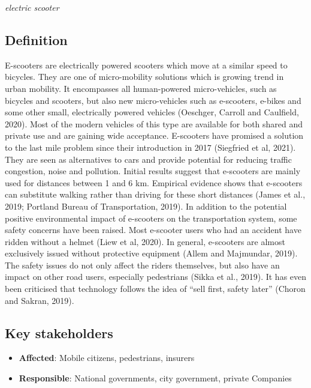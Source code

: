 \documentclass[
]{book}
\providecommand{\tightlist}{%
  \setlength{\itemsep}{0pt}\setlength{\parskip}{0pt}}
\begin{document}
\emph{electric scooter}

\hypertarget{definition-33}{%
\subsection*{Definition}\label{definition-33}}

E-scooters are electrically powered scooters which move at a similar speed to bicycles. They are one of micro-mobility solutions which is growing trend in urban mobility. It encompasses all human-powered micro-vehicles, such as bicycles and scooters, but also new micro-vehicles such as e-scooters, e-bikes and some other small, electrically powered vehicles (Oeschger, Carroll and Caulfield, 2020). Most of the modern vehicles of this type are available for both shared and private use and are gaining wide acceptance.
E-scooters have promised a solution to the last mile problem since their introduction in 2017 (Siegfried et al, 2021). They are seen as alternatives to cars and provide potential for reducing traffic congestion, noise and pollution. Initial results suggest that e-scooters are mainly used for distances between 1 and 6 km. Empirical evidence shows that e-scooters can substitute walking rather than driving for these short distances (James et al., 2019; Portland Bureau of Transportation, 2019). In addition to the potential positive environmental impact of e-scooters on the transportation system, some safety concerns have been raised. Most e-scooter users who had an accident have ridden without a helmet (Liew et al, 2020). In general, e-scooters are almost exclusively issued without protective equipment (Allem and Majmundar, 2019). The safety issues do not only affect the riders themselves, but also have an impact on other road users, especially pedestrians (Sikka et al., 2019). It has even been criticised that technology follows the idea of ``sell first, safety later'' (Choron and Sakran, 2019).

\hypertarget{key-stakeholders-33}{%
\subsection*{Key stakeholders}\label{key-stakeholders-33}}

\begin{itemize}
\tightlist
\item
  \textbf{Affected}: Mobile citizens, pedestrians, insurers
\item
  \textbf{Responsible}: National governments, city government, private Companies
\end{itemize}
\end{document}
